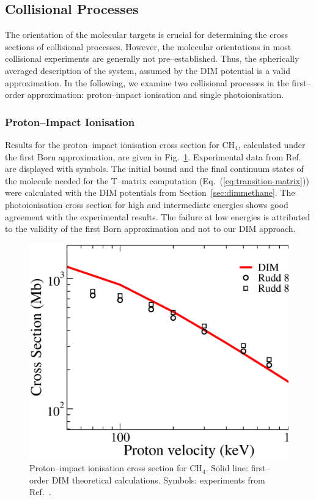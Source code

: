 \documentclass[10pt]{article}
\begin{document}
\subsection{Collisional Processes}

The orientation of the molecular targets is crucial for determining
the cross sections of collisional processes. However, the molecular 
orientations in most collisional experiments are generally not 
pre--established. Thus, the spherically averaged description of the system, 
assumed by the DIM potential is a valid approximation. In the 
following, we examine two collisional processes in the first--order 
approximation: proton--impact ionisation 
and single photoionisation. 

\subsubsection{Proton--Impact Ionisation}

Results for the proton--impact ionisation cross section for CH$_4$,
calculated under the first Born approximation, are given in 
Fig.~\ref{fig:ionch4}. 
Experimental data from Ref.~\cite{Rudd1983,Rudd1985} are displayed 
with symbols. The initial bound and the final continuum states 
of the molecule needed for the T--matrix computation 
(Eq.~(\ref{eq:transition-matrix})) were calculated 
with the DIM potentials from Section~\ref{sec:dimmethane}. 
The photoionisation cross section for high and intermediate energies
shows good agreement with the experimental results. The failure at
low energies is attributed to the validity of the first Born 
approximation and not to our DIM approach.

\begin{figure}[H]
\centering
\includegraphics[height=0.23\textheight]{figures/dimpot/born_ionch4.eps}
\caption{Proton--impact ionisation cross section for CH$_4$. Solid 
line: first--order DIM theoretical calculations. Symbols: experiments 
from Ref.~\cite{Rudd1983,Rudd1985}.}
\label{fig:ionch4}
\end{figure}
\end{document}
